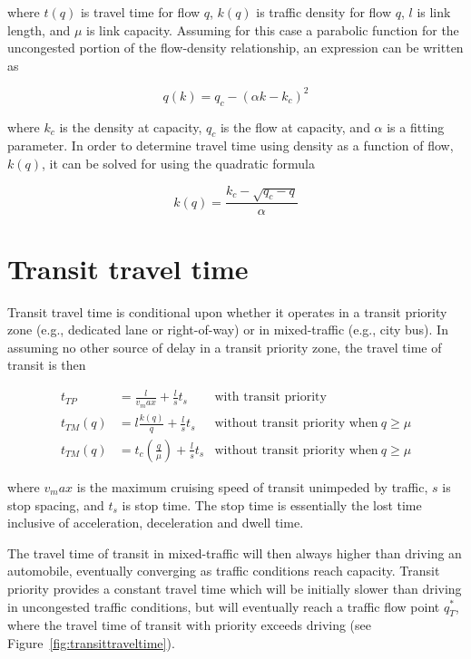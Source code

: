 \documentclass{article}
\begin{document}
\noindent where $t(q)$ is travel time for flow $q$, $k(q)$ is traffic density for flow $q$, $l$ is link length, and $\mu$ is link capacity. Assuming for this case a parabolic function for the uncongested portion of the flow-density relationship, an expression can be written as

\begin{equation}
    q(k) = q_c - (\alpha k - k_c)^2
\end{equation}

\noindent where $k_c$ is the density at capacity, $q_c$ is the flow at capacity, and $\alpha$ is a fitting parameter. In order to determine travel time using density as a function of flow, $k(q)$, it can be solved for using the quadratic formula

\begin{equation}
    k(q) = \frac{k_c - \sqrt{q_c - q}}{\alpha}
\end{equation}


\section{Transit travel time}

Transit travel time is conditional upon whether it operates in a transit priority zone (e.g., dedicated lane or right-of-way) or in mixed-traffic (e.g., city bus). In assuming no other source of delay in a transit priority zone, the travel time of transit is then

\begin{subequations}
\begin{align}
    t_{TP} & = \frac{l}{v_max} + \frac{l}{s}t_s  & \text{with transit priority} \\
    t_{TM}(q) & = l\frac{k(q)}{q} + \frac{l}{s}t_s  & \text{without transit priority when}~q \geq \mu\\
    t_{TM}(q) & = t_c \left(\frac{q}{\mu}\right) + \frac{l}{s}t_s & \text{without transit priority when}~q \geq \mu
\end{align}
\end{subequations}

\noindent where $v_max$ is the maximum cruising speed of transit unimpeded by traffic, $s$ is stop spacing, and $t_s$ is stop time. The stop time is essentially the lost time inclusive of acceleration, deceleration and dwell time.

The travel time of transit in mixed-traffic will then always higher than driving an automobile, eventually converging as traffic conditions reach capacity. Transit priority provides a constant travel time which will be initially slower than driving in uncongested traffic conditions, but will eventually reach a traffic flow point $q^*_T$, where the travel time of transit with priority exceeds driving (see Figure~\ref{fig:transittraveltime}). 
\end{document}
